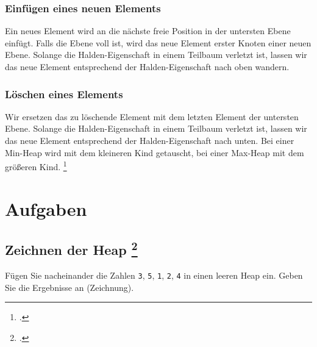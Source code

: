 \documentclass{lehramt-informatik-haupt}
\begin{document}
%

\subsection{Einfügen eines neuen Elements}

Ein neues Element wird an die nächste freie Position in der untersten
Ebene einfügt. Falls die Ebene voll ist, wird das neue Element erster
Knoten einer neuen Ebene. Solange die Halden-Eigenschaft in einem
Teilbaum verletzt ist, lassen wir das neue Element entsprechend der
Halden-Eigenschaft nach oben wandern.

%

\subsection{Löschen eines Elements}

Wir ersetzen das zu löschende Element mit dem letzten Element der
untersten Ebene.
%
Solange die Halden-Eigenschaft in einem Teilbaum verletzt ist, lassen
wir das neue Element entsprechend der Halden-Eigenschaft nach unten.
%
Bei einer Min-Heap wird mit dem kleineren Kind getauscht, bei einer
Max-Heap mit dem größeren Kind.
\footcite[Seite 28]{aud:fs:tafeluebung-11}


\chapter{Aufgaben}

\section{Zeichnen der Heap
\footcite[Seite 4, Aufgabe 7: Heap (H 2012 (66115) - T2, A7, a/ii)]{aud:ab:7}}

Fügen Sie nacheinander die Zahlen \texttt{3}, \texttt{5}, \texttt{1},
\texttt{2}, \texttt{4} in einen leeren Heap ein. Geben Sie die
Ergebnisse an (Zeichnung).
\end{document}
